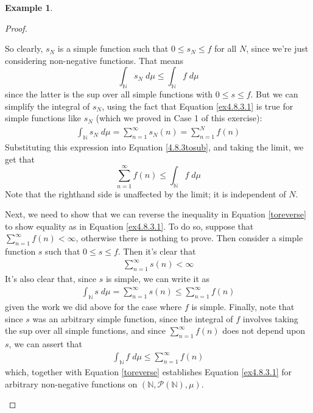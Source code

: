 \documentclass[12pt]{article}
\theoremstyle{plain}
\theoremstyle{definition}
\newtheorem{ex}[thm]{Example}
\theoremstyle{remark}
\begin{document}
\begin{ex}
\begin{proof}
\begin{enumerate}
      So clearly, $s_N$ is a simple function such that $0\leq s_N \leq
      f$ for all $N$, since we're just considering non-negative
      functions.  That means
      \begin{equation}
          \label{4.8.3tosub}
          \int_\mathbb{N} s_N \;d\mu \leq
          \int_\mathbb{N} f \;d\mu
      \end{equation}
      since the latter is the sup over all simple functions with $0\leq
      s\leq f$. But we can simplify the integral of $s_N$, using the
      fact that Equation \ref{ex4.8.3.1} is true for simple functions
      like $s_N$ (which we proved in Case 1 of this exercise):
      \begin{align*}
        \int_\mathbb{N} s_N \;d\mu = \sum^\infty_{n=1}s_N(n)
        = \sum^N_{n=1} f(n)
      \end{align*}
      Substituting this expression into Equation \ref{4.8.3tosub}, and
      taking the limit, we get that
      \begin{equation}
          \label{toreverse}
          \sum^\infty_{n=1} f(n) \leq \int_\mathbb{N} f\; d\mu
      \end{equation}
      Note that the righthand side is unaffected by the limit; it is
      independent of $N$.

      Next, we need to show that we can reverse the inequality in
      Equation \ref{toreverse} to show equality as in Equation
      \ref{ex4.8.3.1}. To do so, suppose that $\sum^\infty_{n=1}
      f(n)<\infty$, otherwise there is nothing to prove. Then consider a
      simple function $s$ such that $0\leq s \leq f$. Then it's clear
      that
      \begin{align*}
        \sum^\infty_{n=1} s(n)<\infty
      \end{align*}
      It's also clear that, since $s$ is simple, we can write it as
      \begin{align*}
        \int_\mathbb{N} s \; d\mu = \sum^\infty_{n=1} s(n)
        \leq \sum^\infty_{n=1} f(n)
      \end{align*}
      given the work we did above for the case where $f$ is simple.
      Finally, note that since $s$ was an arbitrary simple function,
      since the integral of $f$ involves taking the sup over all simple
      functions, and since $\sum^\infty_{n=1}f(n)$ does not depend upon
      $s$, we can assert that
      \begin{align*}
        \int_\mathbb{N} f \; d\mu \leq \sum^\infty_{n=1} f(n)
      \end{align*}
      which, together with Equation \ref{toreverse} establishes Equation
      \ref{ex4.8.3.1} for arbitrary non-negative functions on
      $(\mathbb{N}, \mathscr{P}(\mathbb{N}), \mu)$.
\end{enumerate}
\end{proof}
\end{ex}
\end{document}
